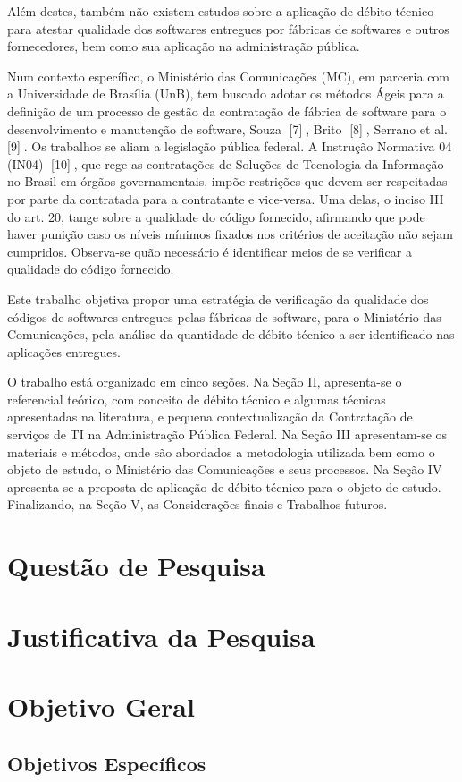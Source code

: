 Além destes, também não existem estudos sobre a aplicação de débito técnico para
atestar qualidade dos softwares entregues por fábricas de softwares e outros
fornecedores, bem como sua aplicação na administração pública.

Num contexto específico, o Ministério das Comunicações (MC), em parceria com a
Universidade de Brasília (UnB), tem buscado adotar os métodos Ágeis para a
definição de um processo de gestão da contratação de fábrica de software para o
desenvolvimento e manutenção de software, Souza [7], Brito [8], Serrano et al. 
[9]. Os trabalhos se aliam a legislação pública federal. A Instrução Normativa 04
(IN04) [10], que rege as contratações de Soluções de Tecnologia da Informação no
 Brasil em órgãos governamentais, impõe restrições que devem ser respeitadas por
 parte da contratada para a contratante e vice-versa. Uma delas, o inciso III do
 art. 20, tange sobre a qualidade do código fornecido, afirmando que pode haver
 punição caso os níveis mínimos fixados nos critérios de aceitação não sejam
 cumpridos. Observa-se quão necessário é identificar meios de se verificar a
 qualidade do código fornecido.

 Este trabalho objetiva propor uma estratégia de verificação da qualidade dos
 códigos de softwares entregues pelas fábricas de software, para o Ministério
 das Comunicações, pela análise da quantidade de débito técnico a ser identificado
 nas aplicações entregues.

 O trabalho está organizado em cinco seções. Na Seção II, apresenta-se o
 referencial teórico, com conceito de débito técnico e algumas técnicas
 apresentadas na literatura, e pequena contextualização da Contratação de
 serviços de TI na Administração Pública Federal. Na Seção III apresentam-se
 os materiais e métodos, onde são abordados a metodologia utilizada bem como o
 objeto de estudo, o Ministério das Comunicações e seus processos. Na Seção IV
 apresenta-se a proposta de aplicação de débito técnico para o objeto de estudo.
 Finalizando, na Seção V, as Considerações finais e Trabalhos futuros.

\section{Questão de Pesquisa}

\section{Justificativa da Pesquisa}

\section{Objetivo Geral}

\subsection{Objetivos Específicos}
